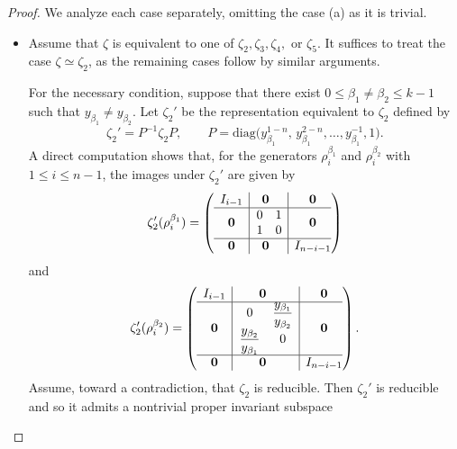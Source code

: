 \documentclass[preprint]{elsarticle}
\begin{document}
\begin{proof}
We analyze each case separately, omitting the case (a) as it is trivial.
\begin{itemize}
\item[(b)]
Assume that $\zeta$ is equivalent to one of
$\zeta_2, \zeta_3, \zeta_4,$ or $\zeta_5$.
It suffices to treat the case $\zeta \simeq \zeta_2$,
as the remaining cases follow by similar arguments.

For the necessary condition, 
suppose that there exist $0 \le \beta_1 \neq \beta_2 \le k-1$ such that
$y_{\beta_1} \neq y_{\beta_2}$.
Let $\zeta_2'$ be the representation equivalent to $\zeta_2$ defined by
\[
\zeta_2'=P^{-1}\zeta_2P,
\qquad
P=\mathrm{diag}\big(y_{\beta_1}^{1-n},\,y_{\beta_1}^{2-n},\ldots,y_{\beta_1}^{-1},1\big).
\]
A direct computation shows that, for the generators $\rho_i^{\beta_1}$ and $\rho_i^{\beta_2}$ with $1\le i\le n-1$, the images under $\zeta_2'$ are given by $$\zeta_2'(\rho_i^{\beta_1})=\left( \begin{array}{c|@{}c|c@{}} \begin{matrix} I_{i-1} \end{matrix} & \textbf{0} & \textbf{0} \\ \hline \textbf{0} &\hspace{0.2cm} \begin{matrix} 0 & 1\\ 1 & 0\\ \end{matrix} & \textbf{0} \\ \hline \textbf{0} & \textbf{0} & I_{n-i-1} \end{array} \right)$$
and
$$\zeta_2'(\rho_i^{\beta_2})=\left( \begin{array}{c|@{}c|c@{}} \begin{matrix} I_{i-1} \end{matrix} & \textbf{0} & \textbf{0} \\ \hline \textbf{0} &\hspace{0.2cm} \begin{matrix} 0 & \dfrac{y_{\beta_1}}{y_{\beta_2}}\\ \dfrac{y_{\beta_2}}{y_{\beta_1}} & 0\\ \end{matrix} & \textbf{0} \\ \hline \textbf{0} & \textbf{0} & I_{n-i-1} \end{array} \right).$$
Assume, toward a contradiction, that $\zeta_2$ is reducible.
Then $\zeta_2'$ is reducible and so it admits a nontrivial proper invariant subspace

\end{itemize}
\end{proof}
\end{document}
